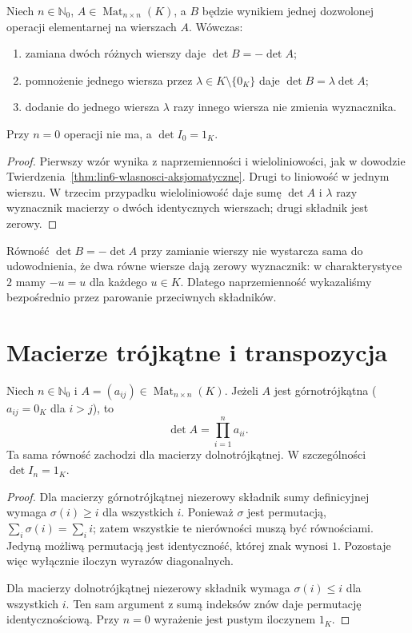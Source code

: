 \begin{wniosek}
\label{cor:lin6-operacje}
Niech \(n\in\mathbb N_0\),
\(A\in\operatorname{Mat}_{n\times n}(K)\),
a \(B\) będzie wynikiem jednej dozwolonej
operacji elementarnej na wierszach \(A\).
Wówczas:
\begin{enumerate}[label=(\roman*)]
\item zamiana dwóch różnych wierszy daje
\(\det B=-\det A\);
\item pomnożenie jednego wiersza
przez \(\lambda\in K\setminus\{0_K\}\)
daje \(\det B=\lambda\det A\);
\item dodanie do jednego wiersza
\(\lambda\) razy innego wiersza
nie zmienia wyznacznika.
\end{enumerate}
Przy \(n=0\) operacji nie ma,
a \(\det I_0=1_K\).
\end{wniosek}
\begin{proof}
Pierwszy wzór wynika z naprzemienności
i wieloliniowości, jak w dowodzie
Twierdzenia~\ref{thm:lin6-wlasnosci-aksjomatyczne}.
Drugi to liniowość w jednym wierszu.
W trzecim przypadku wieloliniowość
daje sumę \(\det A\) i
\(\lambda\) razy wyznacznik macierzy
o dwóch identycznych wierszach;
drugi składnik jest zerowy.
\end{proof}

\begin{uwaga}
\label{rem:lin6-char2}
Równość \(\det B=-\det A\)
przy zamianie wierszy nie wystarcza
sama do udowodnienia, że dwa równe
wiersze dają zerowy wyznacznik:
w charakterystyce \(2\) mamy
\(-u=u\) dla każdego \(u\in K\).
Dlatego naprzemienność wykazaliśmy
bezpośrednio przez parowanie
przeciwnych składników.
\end{uwaga}

\section{Macierze trójkątne i transpozycja}
\label{sec:lin6-trojkatne}

\begin{twierdzenie}
\label{thm:lin6-trojkatna}
Niech \(n\in\mathbb N_0\) i
\(A=(a_{ij})\in\operatorname{Mat}_{n\times n}(K)\).
Jeżeli \(A\) jest górnotrójkątna
(\(a_{ij}=0_K\) dla \(i>j\)),
to
\[
 \det A=\prod_{i=1}^n a_{ii}.
\]
Ta sama równość zachodzi dla
macierzy dolnotrójkątnej.
W szczególności \(\det I_n=1_K\).
\end{twierdzenie}
\begin{proof}
Dla macierzy górnotrójkątnej
niezerowy składnik sumy definicyjnej
wymaga \(\sigma(i)\geq i\)
dla wszystkich \(i\).
Ponieważ \(\sigma\) jest permutacją,
\(\sum_i\sigma(i)=\sum_i i\);
zatem wszystkie te nierówności
muszą być równościami.
Jedyną możliwą permutacją jest
identyczność, której znak wynosi \(1\).
Pozostaje więc wyłącznie iloczyn
wyrazów diagonalnych.

Dla macierzy dolnotrójkątnej
niezerowy składnik wymaga
\(\sigma(i)\leq i\) dla wszystkich \(i\).
Ten sam argument z sumą indeksów
znów daje permutację identycznościową.
Przy \(n=0\) wyrażenie jest
pustym iloczynem \(1_K\).
\end{proof}

